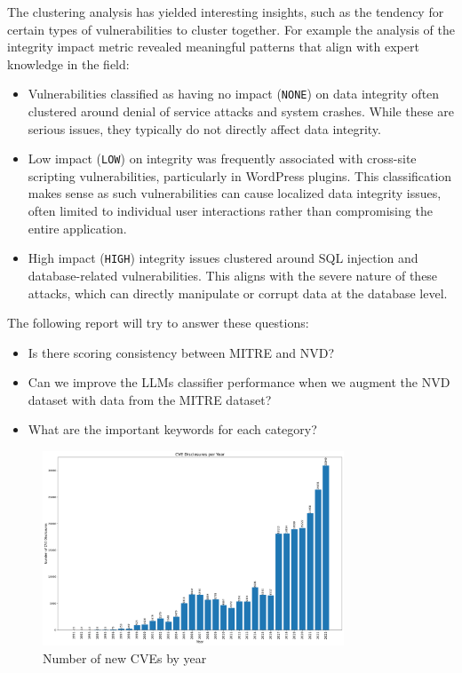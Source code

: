 \documentclass[12pt]{article}
\begin{document}
The clustering analysis has yielded interesting insights, such as the tendency for certain types of
vulnerabilities to cluster together. For example the analysis of the integrity impact metric revealed meaningful patterns that align with expert knowledge in the field:

\begin{itemize}

	\item Vulnerabilities classified as having no impact (\texttt{NONE}) on data integrity often
	      clustered around denial of service attacks and system crashes. While these are serious
	      issues, they typically do not directly affect data integrity.

	\item Low impact (\texttt{LOW}) on integrity was frequently associated with cross-site scripting
	      vulnerabilities, particularly in WordPress plugins. This classification makes sense as such
	      vulnerabilities can cause localized data integrity issues, often limited to individual user
	      interactions rather than compromising the entire application.

	\item High impact (\texttt{HIGH}) integrity issues clustered around SQL injection and
	      database-related vulnerabilities. This aligns with the severe nature of these attacks, which
	      can directly manipulate or corrupt data at the database level.

\end{itemize}

The following report will try to answer these questions:

\begin{itemize}
	\item Is there scoring consistency between MITRE and NVD?

	\item Can we improve the LLMs classifier performance when we augment the NVD dataset with data
	      from the MITRE dataset?

	\item What are the important keywords for each category?
\end{itemize}



\begin{figure}[ht] \centering
	\includegraphics[width=0.8\textwidth]{figures/cves_per_year.pdf}
	\caption{\label{fig:cves_per_year}Number of new CVEs by year}
\end{figure}
\end{document}
